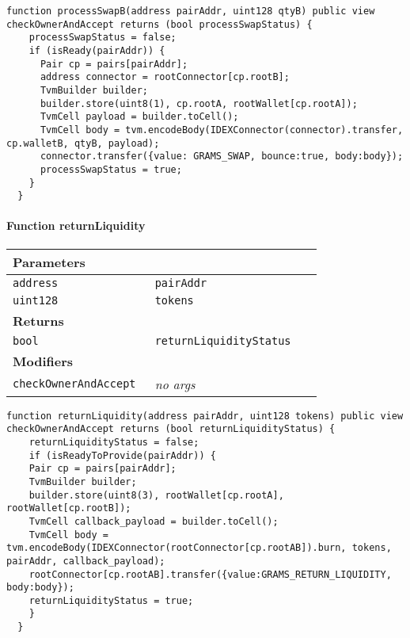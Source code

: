 \vspace{2cm}

\begin{lstlisting}[firstnumber=236]
  function processSwapB(address pairAddr, uint128 qtyB) public view checkOwnerAndAccept returns (bool processSwapStatus) {
    processSwapStatus = false;
    if (isReady(pairAddr)) {
      Pair cp = pairs[pairAddr];
      address connector = rootConnector[cp.rootB];
      TvmBuilder builder;
      builder.store(uint8(1), cp.rootA, rootWallet[cp.rootA]);
      TvmCell payload = builder.toCell();
      TvmCell body = tvm.encodeBody(IDEXConnector(connector).transfer, cp.walletB, qtyB, payload);
      connector.transfer({value: GRAMS_SWAP, bounce:true, body:body});
      processSwapStatus = true;
    }
  }
\end{lstlisting}

\paragraph{Function returnLiquidity}


\ifsoltables
\noindent\begin{tabular}{|l|l|p{5cm}|}\hline
\multicolumn{3}{|l|}{\bf Parameters}\\\hline
\tt address & \tt pairAddr &\\\hline
\tt uint128 & \tt tokens &\\\hline
\multicolumn{3}{|l|}{\bf Returns}\\\hline
\tt bool & \tt returnLiquidityStatus &\\\hline
\multicolumn{3}{|l|}{\bf Modifiers}\\\hline
\tt checkOwnerAndAccept & {\em no args} &\\\hline
\end{tabular}
\fi

\vspace{2cm}

\begin{lstlisting}[firstnumber=272]
  function returnLiquidity(address pairAddr, uint128 tokens) public view checkOwnerAndAccept returns (bool returnLiquidityStatus) {
    returnLiquidityStatus = false;
    if (isReadyToProvide(pairAddr)) {
    Pair cp = pairs[pairAddr];
    TvmBuilder builder;
    builder.store(uint8(3), rootWallet[cp.rootA], rootWallet[cp.rootB]);
    TvmCell callback_payload = builder.toCell();
    TvmCell body = tvm.encodeBody(IDEXConnector(rootConnector[cp.rootAB]).burn, tokens, pairAddr, callback_payload);
    rootConnector[cp.rootAB].transfer({value:GRAMS_RETURN_LIQUIDITY, body:body});
    returnLiquidityStatus = true;
    }
  }
\end{lstlisting}

